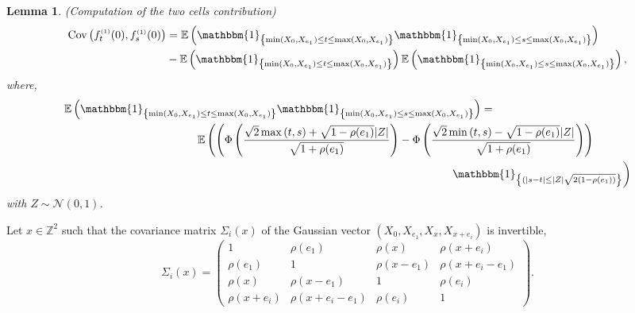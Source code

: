 \documentclass[12pt]{article}
\theoremstyle{Theorem}
\newtheorem{Lemma}[Theorem]{Lemma}
\theoremstyle{definition}
\begin{document}
\begin{Lemma}(Computation of the two cells contribution)
\begin{align*}
\text{Cov}\left(f_{t}^{\scriptscriptstyle (1)}(0), f_{s}^{\scriptscriptstyle (1)}(0)\right) & = \mathbb{E}\left(\mathbbm{1}_{\left\{\min(X_{\scriptscriptstyle 0}, X_{\scriptscriptstyle  e_1}) \leq t \leq \max(X_{\scriptscriptstyle 0}, X_{e_1})\right\}}\mathbbm{1}_{\left\{\min(X_{\scriptscriptstyle 0}, X_{ \scriptscriptstyle  e_1}) \leq s \leq \max(X_{\scriptscriptstyle 0}, X_{\scriptscriptstyle e_1}) \right\}}\right) \\
& - \mathbb{E}\left(\mathbbm{1}_{\left\{\min(X_{\scriptscriptstyle 0}, X_{e_1}) \leq t \leq \max(X_{\scriptscriptstyle 0}, X_{e_1})\right\}}\right)\mathbb{E}\left(\mathbbm{1}_{\left\{\min(X_{\scriptscriptstyle 0}, X_{e_1}) \leq s \leq \max(X_{\scriptscriptstyle 0}, X_{e_1})\right\}}\right),
\end{align*}
where, 
{\small
\begin{align*}
\mathbb{E}\left(\mathbbm{1}_{\left\{\min(X_{\scriptscriptstyle 0}, X_{\scriptscriptstyle  e_1}) \leq t \leq \max(X_{\scriptscriptstyle 0}, X_{e_1})\right\}}\mathbbm{1}_{\left\{\min(X_{\scriptscriptstyle 0}, X_{ \scriptscriptstyle  e_1}) \leq s \leq \max(X_{\scriptscriptstyle 0}, X_{\scriptscriptstyle e_1}) \right\}}\right) & = \\
& \hspace{-9cm}\mathbb{E}\left(\left(\Phi\left(\dfrac{\sqrt{2}\max\left(t,s\right) + \sqrt{1-\rho(e_1)}|Z|}{\sqrt{1+\rho(e_1)}}\right)  - \Phi\left(\dfrac{\sqrt{2}\min\left(t,s\right) - \sqrt{1-\rho(e_1)}|Z|}{\sqrt{1+\rho(e_1)}}\right)\right)\right. \\
& \hspace{-1cm} \left.\mathbbm{1}_{\left\{(|s-t| \leq |Z|\sqrt{2(1-\rho(e_1))}\right\}}\right)
\end{align*}}
with $Z \sim \mathcal{N}(0,1)$. 
\end{Lemma}
Let $x \in \mathbb{Z}^{2}$ such that the covariance matrix $\Sigma_{i}(x)$ of the Gaussian vector $\left(X_{\scriptscriptstyle 0}, X_{e_1}, X_{\scriptscriptstyle x}, X_{x+e_i}\right)$ is invertible, 
$$\Sigma_{i}(x) = \begin{pmatrix} 1 & \rho(e_1) & \rho(x) & \rho(x+e_i)\\
\rho(e_1) & 1 & \rho(x-e_1) &  \rho(x+e_i- e_1) \\ 
\rho(x) & \rho(x-e_1) & 1 & \rho(e_i) \\
\rho(x+e_i) & \rho(x+e_i-e_1) & \rho(e_i) & 1 \end{pmatrix}.$$
\end{document}
